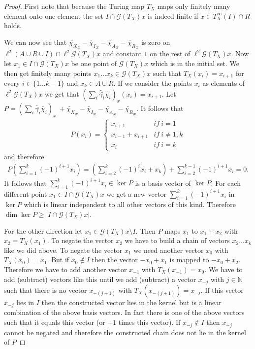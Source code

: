 \documentclass[12pt,a4paper]{scrartcl}
\theoremstyle{plain}
\theoremstyle{definition}
\numberwithin{equation}{section}
\newcommand{\N}{\mathbb{N}} %
\newcommand{\2}{\mathbb{Z} / 2 \mathbb{Z}}
\newcommand{\G}{\mathcal{G}}
\newcommand{\1}{\bar{1}}
\newcommand{\0}{\bar{0}}
\begin{document}
\begin{proof}
	First note that because the Turing map $T_X$ maps only finitely many element onto one element the set $I \cap \G (T_X)x$ is indeed finite if $x \in T_X^\infty(I) \cap R$ holds.
	 
	We can now see that $\tilde{\chi_X}_x - \tilde{\chi_I}_x - \tilde{\chi_A}_x - \tilde{\chi_R}_x$ is zero on $\ell^2(A \cup R \cup I) \cap \ell^2 \G (T_X)x$ and constant $1$ on the rest of $\ell^2 \G (T_X)x$. Now let $x_1 \in I \cap \G (T_X)x$ be  one point of $\G (T_X)x$ which is in the initial set. We then get finitely many points $x_1 \ldots x_k \in \G (T_X)x$ such that $T_X(x_i) = x_{i + 1}$ for every $i \in \{1 \ldots k - 1\}$ and $x_k \in A \cup R$. If we consider the points $x_i$ as elements of $\ell^2 \G (T_X)x$ we get that $(\sum_{i} \tilde{\bar{\gamma_i}} \tilde{\chi_i})_x(x_i) =x_{i+1}$. Let $P = (\sum_{i} \tilde{\bar{\gamma_i}} \tilde{\chi_i})_x \ + \tilde{\chi_X}_x - \tilde{\chi_I}_x - \tilde{\chi_A}_x - \tilde{\chi_R}_x$. It follows that
	\begin{align*}
		P(x_i) = \begin{cases}
		x_{i + 1} & if \ i = 1 \\
		x_{i - 1} + x_{i + 1} & if \ i \neq 1, k \\
		x_{i} & if \ i = k
		\end{cases}
	\end{align*}
	and therefore 
	\begin{align*}
		P(\sum_{i = 1}^{k} (-1)^{i + 1} x_i) = (\sum_{i = 2}^{k} (-1)^{i} x_{i} + x_k) + \sum_{i = 2}^{k - 1} (-1)^{i + 1} x_{i} = 0.
	\end{align*}
	It follows that $\sum_{i = 1}^{k} (-1)^{i + 1} x_i \in \ker P$ is a basis vector of $ \ker P$. For each different point $x_1 \in  I \cap \G (T_X)x$ we get a new vector $\sum_{i = 1}^{k} (-1)^{i + 1} x_i$ in $\ker P$ which is linear independent to all other vectors of this kind. Therefore $\dim \ker P \ge |I \cap \G (T_X)x| $.
	
	 For the other direction let $x_1 \in \G (T_X)x \setminus I$. Then $P$ maps $x_1$ to $x_1 + x_2$ with $x_2 = T_X(x_1)$. To negate the vector $x_2$  we have to build a chain of vectors $x_2 \ldots x_k$ like we did above. To negate the vector $x_1$ we need another vector $x_0$ with $T_X(x_0) = x_1$. But if $x_0 \notin I$ then the vector $-x_0 + x_1$ is mapped to $-x_0 + x_2$. Therefore we have to add another vector $x_{-1}$ with $T_X(x_{-1}) = x_0$. We have to add (subtract) vectors like this until we add (subtract) a vector $x_{-j}$ with $j \in \N$ such that there is no vector $x_{-(j+1)}$ with $T_X(x_{-(j+1)}) = x_{-j}$. If this vector $x_{-j}$ lies in $I$ then the constructed vector lies in the kernel but is a linear combination of the above basis vectors. In fact there is one of the above vectors such that it equals this vector (or $-1$ times this vector). If $x_{-j} \notin I$ then $x_{-j}$ cannot be negated and therefore the constructed chain does not lie in the kernel of $P$
	

\end{proof}
\end{document}
